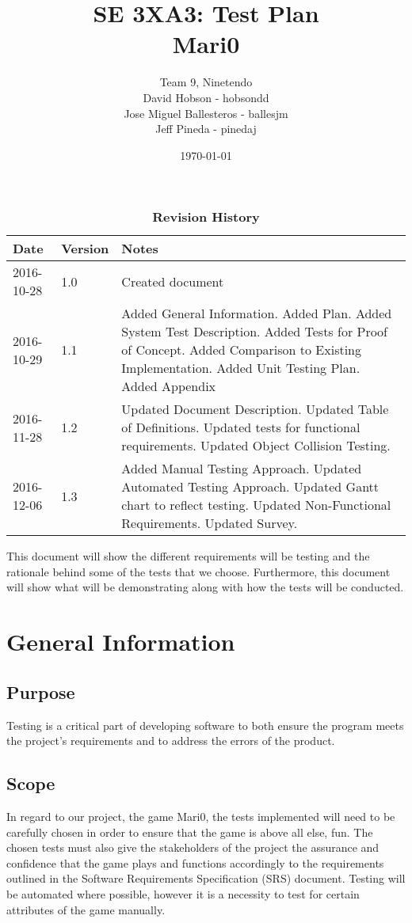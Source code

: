 \documentclass[12pt, titlepage]{article}
\title{SE 3XA3: Test Plan\\Mari0}
\author{Team 9, Ninetendo
		\\ David Hobson - hobsondd
		\\ Jose Miguel Ballesteros - ballesjm
		\\ Jeff Pineda - pinedaj
}
\date{\today}
\begin{document}
\maketitle

\tableofcontents
\listoftables

\begin{table}[h]
\caption{\bf Revision History}
\begin{tabularx}{\textwidth}{p{3cm}p{2cm}X}
\toprule {\bf Date} & {\bf Version} & {\bf Notes}\\
\midrule
2016-10-28 & 1.0 & Created document\\
2016-10-29 & 1.1 & Added General Information. Added Plan. Added System Test Description. Added Tests for Proof of Concept. Added Comparison to Existing Implementation. Added Unit Testing Plan. Added Appendix\\
2016-11-28 & 1.2 & Updated Document Description. Updated Table of Definitions. Updated tests for functional requirements. Updated Object Collision Testing. \\
2016-12-06 & 1.3 & Added Manual Testing Approach. Updated Automated Testing Approach. Updated Gantt chart to reflect testing. Updated Non-Functional Requirements. Updated Survey.\\
\bottomrule
\end{tabularx}
\end{table}

\newpage

This document will show the different requirements will be testing and the rationale behind some of the tests that we choose. Furthermore, this document will show what will be demonstrating along with how the tests will be conducted. 

\section{General Information}

\subsection{Purpose}
Testing is a critical part of developing software to both ensure the program meets the project's requirements and to address the errors of the product. 
\subsection{Scope}
In regard to our project, the game Mari0, the tests implemented will need to be carefully chosen in order to ensure that the game is above all else, fun. The chosen tests must also give the stakeholders of the project the assurance and confidence that the game plays and functions accordingly to the requirements outlined in the Software Requirements Specification (SRS) document. Testing will be automated where possible, however it is a necessity to test for certain attributes of the game manually.
\end{document}
